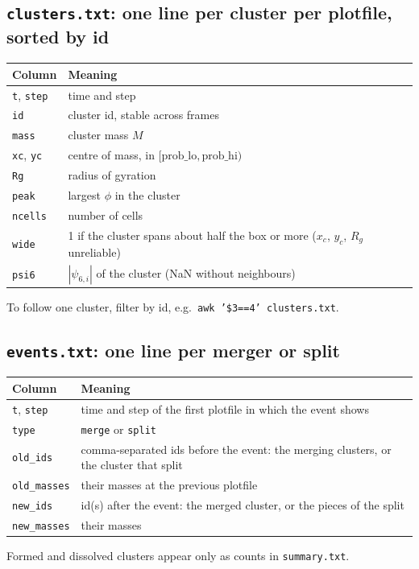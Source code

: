 \documentclass[11pt]{article}
\newcommand{\code}[1]{\texttt{#1}}
\begin{document}
\subsection*{\code{clusters.txt}: one line per cluster per plotfile, sorted by id}
\begin{center}
\begin{tabularx}{\textwidth}{@{}l L@{}}
\toprule
Column & Meaning \\
\midrule
\code{t}, \code{step} & time and step \\
\code{id} & cluster id, stable across frames \\
\code{mass} & cluster mass $M$ \\
\code{xc}, \code{yc} & centre of mass, in $[\text{prob\_lo}, \text{prob\_hi})$ \\
\code{Rg} & radius of gyration \\
\code{peak} & largest $\phi$ in the cluster \\
\code{ncells} & number of cells \\
\code{wide} & 1 if the cluster spans about half the box or more ($x_c$, $y_c$, $R_g$ unreliable) \\
\code{psi6} & $|\psi_{6,i}|$ of the cluster (NaN without neighbours) \\
\bottomrule
\end{tabularx}
\end{center}
To follow one cluster, filter by id, e.g.\ \code{awk '\$3==4' clusters.txt}.

\subsection*{\code{events.txt}: one line per merger or split}
\begin{center}
\begin{tabularx}{\textwidth}{@{}l L@{}}
\toprule
Column & Meaning \\
\midrule
\code{t}, \code{step} & time and step of the first plotfile in which the event shows \\
\code{type} & \code{merge} or \code{split} \\
\code{old\_ids} & comma-separated ids before the event: the merging clusters, or the cluster that split \\
\code{old\_masses} & their masses at the previous plotfile \\
\code{new\_ids} & id(s) after the event: the merged cluster, or the pieces of the split \\
\code{new\_masses} & their masses \\
\bottomrule
\end{tabularx}
\end{center}
Formed and dissolved clusters appear only as counts in \code{summary.txt}.
\end{document}
